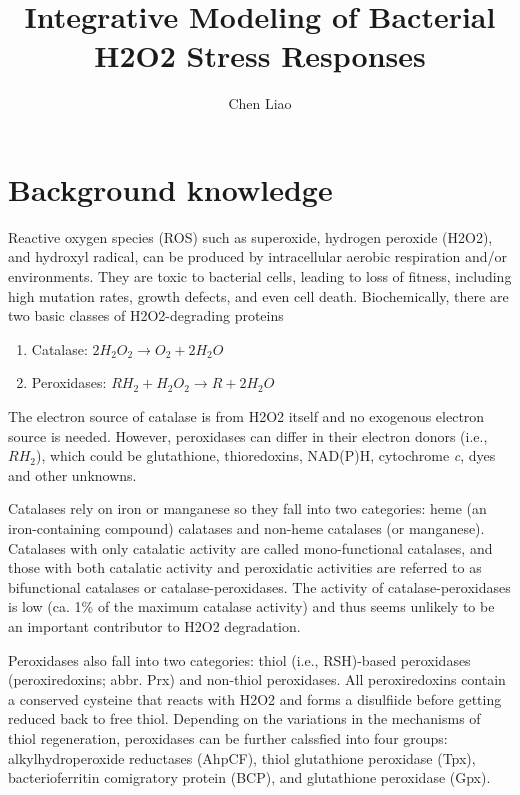\documentclass[11pt]{article}
\begin{document}
\title{Integrative Modeling of Bacterial H2O2 Stress Responses}
\author{Chen Liao}

\maketitle
\tableofcontents


\section{Background knowledge}

Reactive oxygen species (ROS) such as superoxide, hydrogen peroxide (H2O2), and hydroxyl radical, can be produced by intracellular aerobic respiration and/or environments. They are toxic to bacterial cells, leading to loss of fitness, including high mutation rates, growth defects, and even cell death. Biochemically, there are two basic classes of H2O2-degrading proteins
\begin{enumerate}
\centering
\item{Catalase: $2H_2O_2 \rightarrow O_2+2H_2O$}
\item{Peroxidases: $RH_2+H_2O_2 \rightarrow R+2H_2O$}
\end{enumerate}
The electron source of catalase is from H2O2 itself and no exogenous electron source is needed. However, peroxidases can differ in their electron donors (i.e., $RH_2$), which could be glutathione, thioredoxins, NAD(P)H, cytochrome \textit{c}, dyes and other unknowns. 

Catalases rely on iron or manganese so they fall into two categories: heme (an iron-containing compound) calatases and non-heme catalases (or manganese). Catalases with only catalatic activity are called mono-functional catalases, and those with both catalatic activity and peroxidatic activities are referred to as bifunctional catalases or catalase-peroxidases. The activity of catalase-peroxidases is low (ca. 1\% of the maximum catalase activity) and thus seems unlikely to be an important contributor to H2O2 degradation.

Peroxidases also fall into two categories: thiol (i.e., RSH)-based peroxidases (peroxiredoxins; abbr. Prx) and non-thiol peroxidases. All peroxiredoxins contain a conserved cysteine that reacts with H2O2 and forms a disulfiide before getting reduced back to free thiol. Depending on the variations in the mechanisms of thiol regeneration, peroxidases can be further calssfied into four groups: alkylhydroperoxide reductases (AhpCF), thiol glutathione peroxidase (Tpx), bacterioferritin comigratory protein (BCP), and glutathione peroxidase (Gpx). 
\end{document}
